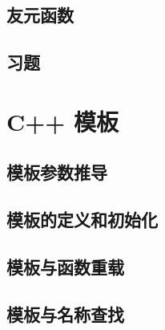 \documentclass{article}
\begin{document}

	\subsection{友元函数}
	
	
	\subsection{习题}
	
	\section{C++ 模板}
	
	\subsection{模板参数推导}
	
	
	\subsection{模板的定义和初始化}
	
	\subsection{模板与函数重载}
	
	\subsection{模板与名称查找}
	
\end{document}
